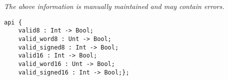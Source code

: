 \label{pkg:range\_check}

{\tiny \it The above information is manually maintained and may contain errors.}
\begin{verbatim}
api {
    valid8 : Int -> Bool;
    valid_word8 : Unt -> Bool;
    valid_signed8 : Int -> Bool;
    valid16 : Int -> Bool;
    valid_word16 : Unt -> Bool;
    valid_signed16 : Int -> Bool;};
\end{verbatim}
